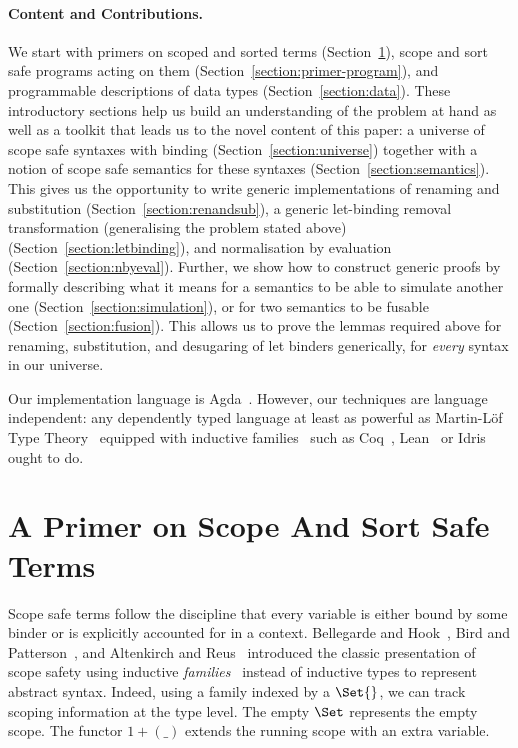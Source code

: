 \paragraph{Content and Contributions.}
We start with primers on scoped and sorted terms
(Section~\ref{section:primer-term}), scope and sort safe programs
acting on them (Section~\ref{section:primer-program}), and
programmable descriptions of data types (Section~\ref{section:data}).
These introductory sections help us build an understanding of the
problem at hand as well as a toolkit that leads us to the novel
content of this paper: a universe of scope safe syntaxes with binding
(Section~\ref{section:universe}) together with a notion of scope safe
semantics for these syntaxes (Section~\ref{section:semantics}).  This
gives us the opportunity to write generic implementations of renaming
and substitution (Section~\ref{section:renandsub}), a generic
let-binding removal transformation (generalising the problem stated
above) (Section~\ref{section:letbinding}), and normalisation by
evaluation (Section~\ref{section:nbyeval}). Further, we show how to
construct generic proofs by formally describing what it means for a
semantics to be able to simulate another one
(Section~\ref{section:simulation}), or for two semantics to be fusable
(Section~\ref{section:fusion}). This allows us to prove the lemmas
required above for renaming, substitution, and desugaring of let binders
generically, for \emph{every} syntax in our universe.

\medskip

Our implementation language is
Agda~\cite{norell2009dependently}. However, our techniques are
language independent: any dependently typed language at least as
powerful as Martin-L\"of Type Theory~\cite{martin1982constructive}
equipped with inductive families~\cite{dybjer1994inductive} such as
Coq~\cite{Coq:manual}, Lean~\cite{DBLP:conf/cade/MouraKADR15} or
Idris~\cite{brady2013idris} ought to do.



\section{A Primer on Scope And Sort Safe Terms}\label{section:primer-term}

Scope safe terms follow the discipline that every variable is
either bound by some binder or is explicitly accounted for in a
context. Bellegarde and Hook~\citeyear{BELLEGARDE1994287}, Bird and Patterson~\citeyear{bird_paterson_1999},
and Altenkirch and Reus~\citeyear{altenkirch1999monadic} introduced the
classic presentation of scope safety using inductive
\emph{families}~\cite{dybjer1994inductive} instead of inductive types to
represent abstract syntax. Indeed, using a family indexed by a $\Set{}$,
we can track scoping information at the type level. The empty $\Set$ represents the empty scope. The functor
$1 + (\_)$ extends the running scope with an extra variable.

